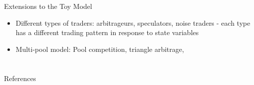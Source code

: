 \documentclass{beamer}
\begin{document}
\begin{frame}{Extensions to the Toy Model}
    \begin{itemize}
        \item Different types of traders: arbitrageurs, speculators, noise traders - each type has a different trading pattern in response to state variables
        \item Multi-pool model: Pool competition, triangle arbitrage,
    \end{itemize}
\end{frame}

\section*{}

\begin{frame}[allowframebreaks]{References}
    \nocite{*}
    \printbibliography
\end{frame}
\end{document}
